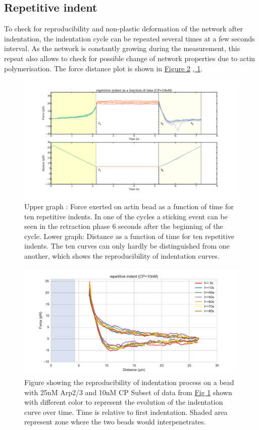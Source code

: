 \documentclass[A4paperpaper,11pt,english]{sphinxmanual}
\begin{document}
\subsection{Repetitive indent}
\label{index-latex:repetitive-indent}
To check for reproducibility and non-plastic deformation of the network after
indentation, the indentation cycle can be repeated several times at a few seconds
interval. As the network is constantly growing during the measurement, this
repeat also allows to check for possible change of network properties due to actin
polymerisation. The force distance plot is shown in \hyperref[index-latex:reproc]{Figure  \ref*{index-latex:reproc}} \hyperref[index-latex:reproc-time]{,  \ref*{index-latex:reproc-time}}.
\begin{figure}[htbp]
\centering
\capstart

\includegraphics[width=1.000\linewidth]{reproc-time.pdf}
\caption{Upper graph : Force exerted on actin bead as a function of time for ten
repetitive indents. In one of the cycles a sticking event can be seen in the
retraction phase 6 seconds after the beginning of the cycle. Lower graph:
Distance as a function of time for  ten repetitive indents. The ten curves
can only hardly be distinguished from one another, which shows the
reproducibility of indentation curves.}\label{index-latex:reproc-time}\end{figure}
\begin{figure}[htbp]
\centering
\capstart

\includegraphics[width=0.800\linewidth]{reproc.pdf}
\caption{Figure showing the reproducibility of indentation process on a bead with
25nM Arp2/3 and 10nM CP Subset of data from \hyperref[index-latex:reproc-time]{Fig  \ref*{index-latex:reproc-time}} shown
with different color to represent the evolution of the indentation curve
over time.  Time is relative to first indentation. Shaded area represent
zone where the two beads would interpenetrates.}\label{index-latex:reproc}\end{figure}
\end{document}
